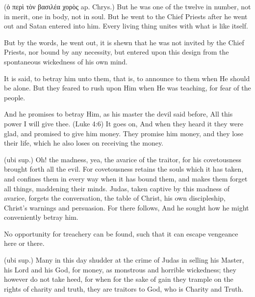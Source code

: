  (\textgreek{ὁ περὶ τὸν βασιλέα χορὸς} ap. Chrys.) But he was one of the twelve in number, not in merit, one in body, not in soul. But he went to the Chief Priests after he went out and Satan entered into him. Every living thing unites with what is like itself.

 But by the words, he went out, it is shewn that he was not invited by the Chief Priests, nor bound by any necessity, but entered upon this design from the spontaneous wickedness of his own mind.

 It is said, to betray him unto them, that is, to announce to them when He should be alone. But they feared to rush upon Him when He was teaching, for fear of the people.

 And he promises to betray Him, as his master the devil said before, All this power I will give thee. (Luke 4:6) It goes on, And when they heard it they were glad, and promised to give him money. They promise him money, and they lose their life, which he also loses on receiving the money.

 (ubi sup.) Oh! the madness, yea, the avarice of the traitor, for his covetousness brought forth all the evil. For covetousness retains the souls which it has taken, and confines them in every way when it has bound them, and makes them forget all things, maddening their minds. Judas, taken captive by this madness of avarice, forgets the conversation, the table of Christ, his own discipleship, Christ’s warnings and persuasion. For there follows, And he sought how he might conveniently betray him.

 No opportunity for treachery can be found, such that it can escape vengeance here or there.

 (ubi sup.) Many in this day shudder at the crime of Judas in selling his Master, his Lord and his God, for money, as monstrous and horrible wickedness; they however do not take heed, for when for the sake of gain they trample on the rights of charity and truth, they are traitors to God, who is Charity and Truth.

 

